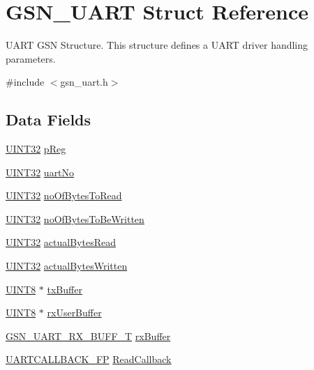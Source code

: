 \hypertarget{a00263}{
\section{GSN\_\-UART Struct Reference}
\label{a00263}
}


UART GSN Structure. This structure defines a UART driver handling parameters.  




{\ttfamily \#include $<$gsn\_\-uart.h$>$}

\subsection*{Data Fields}
\begin{DoxyCompactItemize}
\item 
\hyperlink{a00660_gae1e6edbbc26d6fbc71a90190d0266018}{UINT32} \hyperlink{a00263_a733fb7afbc3bd37a546de0e37c12f150}{pReg}
\item 
\hyperlink{a00660_gae1e6edbbc26d6fbc71a90190d0266018}{UINT32} \hyperlink{a00263_a2595350cfd596e9acd266bb56bd4647a}{uartNo}
\item 
\hyperlink{a00660_gae1e6edbbc26d6fbc71a90190d0266018}{UINT32} \hyperlink{a00263_a96ecaff82c1cc0fe60c48e5eb2b2e471}{noOfBytesToRead}
\item 
\hyperlink{a00660_gae1e6edbbc26d6fbc71a90190d0266018}{UINT32} \hyperlink{a00263_ae09323dd91f7fb30eeaa3d7e3ec1c2a8}{noOfBytesToBeWritten}
\item 
\hyperlink{a00660_gae1e6edbbc26d6fbc71a90190d0266018}{UINT32} \hyperlink{a00263_a2bbf2fcbc8e54eea4413aa5214f4e0aa}{actualBytesRead}
\item 
\hyperlink{a00660_gae1e6edbbc26d6fbc71a90190d0266018}{UINT32} \hyperlink{a00263_acaadb3f45d67507c5f8f58ab6df0a970}{actualBytesWritten}
\item 
\hyperlink{a00660_gab27e9918b538ce9d8ca692479b375b6a}{UINT8} $\ast$ \hyperlink{a00263_aaa16ff66d9982ada7aebae8e16dd1579}{txBuffer}
\item 
\hyperlink{a00660_gab27e9918b538ce9d8ca692479b375b6a}{UINT8} $\ast$ \hyperlink{a00263_ab193a10d1ff3641a6f7675c7f15b1fd5}{rxUserBuffer}
\item 
\hyperlink{a00267}{GSN\_\-UART\_\-RX\_\-BUFF\_\-T} \hyperlink{a00263_aceef132d7c6846efeb1a96c1aaa7cd5b}{rxBuffer}
\item 
\hyperlink{a00600_a2e597592e12f52e6b9f19cffdcd2378f}{UARTCALLBACK\_\-FP} \hyperlink{a00263_a73e06b436ebc4ceeb7b949d3487b76ba}{ReadCallback}
\item 

\end{DoxyCompactItemize}
